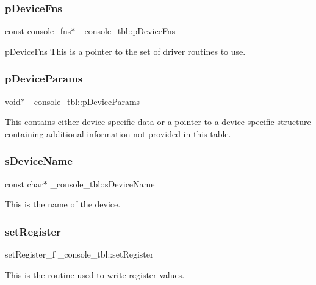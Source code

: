 \subsubsection{\texorpdfstring{pDeviceFns}{pDeviceFns}}
{\footnotesize\ttfamily const \mbox{\hyperlink{struct__console__fns}{console\+\_\+fns}}$\ast$ \+\_\+console\+\_\+tbl\+::p\+Device\+Fns}

p\+Device\+Fns This is a pointer to the set of driver routines to use. \mbox{\label{struct__console__tbl_a153788e00d296408bb3e1f9f65864461}} 
\subsubsection{\texorpdfstring{pDeviceParams}{pDeviceParams}}
{\footnotesize\ttfamily void$\ast$ \+\_\+console\+\_\+tbl\+::p\+Device\+Params}

This contains either device specific data or a pointer to a device specific structure containing additional information not provided in this table. \mbox{\label{struct__console__tbl_afaaac8d73af8665cdb2128ed0daedac1}} 
\subsubsection{\texorpdfstring{sDeviceName}{sDeviceName}}
{\footnotesize\ttfamily const char$\ast$ \+\_\+console\+\_\+tbl\+::s\+Device\+Name}

This is the name of the device. \mbox{\label{struct__console__tbl_a134f051c4f122ef709d302656dd508f8}} 
\subsubsection{\texorpdfstring{setRegister}{setRegister}}
{\footnotesize\ttfamily set\+Register\+\_\+f \+\_\+console\+\_\+tbl\+::set\+Register}

This is the routine used to write register values. \mbox{\label{struct__console__tbl_a06aee31d1ddb05ff9c18ca084684a482}} 
